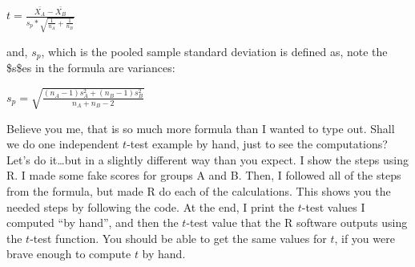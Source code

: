 \documentclass[
  letterpaper,
  DIV=11,
  numbers=noendperiod]{scrreprt}
\begin{document}
\(t = \frac{\bar{X_A}-\bar{X_B}}{s_p * \sqrt{\frac{1}{n_A} + \frac{1}{n_B}}}\)

and, \(s_p\), which is the pooled sample standard deviation is defined
as, note the \$s\$es in the formula are variances:

\(s_p = \sqrt{\frac{(n_A-1)s_A^2 + (n_B-1)s^2_B}{n_A +n_B -2}}\)

Believe you me, that is so much more formula than I wanted to type out.
Shall we do one independent \(t\)-test example by hand, just to see the
computations? Let's do it\ldots but in a slightly different way than you
expect. I show the steps using R. I made some fake scores for groups A
and B. Then, I followed all of the steps from the formula, but made R do
each of the calculations. This shows you the needed steps by following
the code. At the end, I print the \(t\)-test values I computed ``by
hand'', and then the \(t\)-test value that the R software outputs using
the \(t\)-test function. You should be able to get the same values for
\(t\), if you were brave enough to compute \(t\) by hand.
\end{document}
